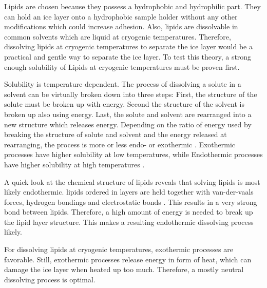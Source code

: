 


Lipids are chosen because they possess a hydrophobic and hydrophilic part. They can hold an ice layer onto a hydrophobic sample holder without any other modifications which could increase adhesion. Also, lipids are dissolvable in common solvents which are liquid at cryogenic temperatures. Therefore, dissolving lipids at cryogenic temperatures to separate the ice layer would be a practical and gentle way to separate the ice layer. To test this theory, a strong enough solubility of Lipids at cryogenic temperatures must be proven first. 

Solubility is temperature dependent. The process of dissolving a solute in a solvent can be virtually broken down into three steps: First, the structure of the solute must be broken up with energy. Second the structure of the solvent is broken up also using energy. Last, the solute and solvent are rearranged into a new structure which releases energy. Depending on the ratio of energy used by breaking the structure of solute and solvent and the energy released at rearranging, the process is more or less endo- or exothermic \cite{ZafirJaveed.}. Exothermic processes have higher solubility at low temperatures, while Endothermic processes have higher solubility at high temperatures \cite{Mortimer.2007}. 

A quick look at the chemical structure of lipids reveals that solving lipids is most likely endothermic. lipids ordered in layers are held together with van-der-vaals forces, hydrogen bondings and electrostatic bonds \cite{RWayneAlbers.1999}. This results in a very strong bond between lipids. Therefore, a high amount of energy is needed to break up the lipid layer structure. This makes a resulting endothermic dissolving process likely.

For dissolving lipids at cryogenic temperatures, exothermic processes are favorable. Still, exothermic processes release energy in form of heat, which can damage the ice layer when heated up too much. Therefore, a mostly neutral dissolving process is optimal. 


